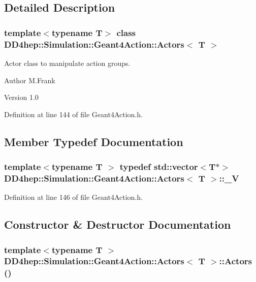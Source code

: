 \subsection{Detailed Description}
\subsubsection*{template$<$typename T$>$ class DD4hep::Simulation::Geant4Action::Actors$<$ T $>$}

Actor class to manipulate action groups. \begin{DoxyAuthor}{Author}
M.Frank 
\end{DoxyAuthor}
\begin{DoxyVersion}{Version}
1.0 
\end{DoxyVersion}


Definition at line 144 of file Geant4Action.h.

\subsection{Member Typedef Documentation}
\hypertarget{class_d_d4hep_1_1_simulation_1_1_geant4_action_1_1_actors_a18b6dfb1542a2cd036d8317db48f6c16}{
\subsubsection[{\_\-V}]{\setlength{\rightskip}{0pt plus 5cm}template$<$typename T $>$ typedef std::vector$<${\bf T}$\ast$$>$ {\bf DD4hep::Simulation::Geant4Action::Actors}$<$ {\bf T} $>$::{\bf \_\-V}}}
\label{class_d_d4hep_1_1_simulation_1_1_geant4_action_1_1_actors_a18b6dfb1542a2cd036d8317db48f6c16}


Definition at line 146 of file Geant4Action.h.

\subsection{Constructor \& Destructor Documentation}
\hypertarget{class_d_d4hep_1_1_simulation_1_1_geant4_action_1_1_actors_af8c90e54776c4e396fbce217553611ec}{
\subsubsection[{Actors}]{\setlength{\rightskip}{0pt plus 5cm}template$<$typename T $>$ {\bf DD4hep::Simulation::Geant4Action::Actors}$<$ {\bf T} $>$::{\bf Actors} ()}}
\label{class_d_d4hep_1_1_simulation_1_1_geant4_action_1_1_actors_af8c90e54776c4e396fbce217553611ec}


